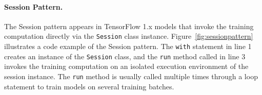 




\paragraph{Session Pattern.} 
The Session pattern appears in TensorFlow 1.x models that invoke the training
computation directly via the {\tt Session} class instance.
Figure~\ref{fig:sessionpattern} illustrates a code example of the Session
pattern. 
The {\tt with} statement in line 1 creates an instance of the {\tt Session}
class, and the {\tt run} method called in line 3 invokes the training
computation on an isolated execution environment of the session instance. 
The {\tt run} method is usually called multiple times through a loop statement
to train models on several training batches.

